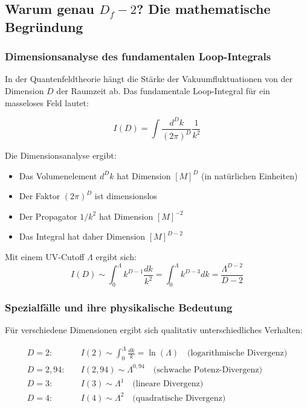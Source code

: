\documentclass[12pt,a4paper]{article}
\theoremstyle{definition}
\begin{document}
	\subsection{Warum genau $D_f - 2$? Die mathematische Begründung}
	
	\subsubsection{Dimensionsanalyse des fundamentalen Loop-Integrals}
	
	In der Quantenfeldtheorie hängt die Stärke der Vakuumfluktuationen von der Dimension $D$ der Raumzeit ab. Das fundamentale Loop-Integral für ein masseloses Feld lautet:
	
	\begin{equation}
		I(D) = \int \frac{d^D k}{(2\pi)^D} \frac{1}{k^2}
	\end{equation}
	
	Die Dimensionsanalyse ergibt:
	\begin{itemize}
		\item Das Volumenelement $d^D k$ hat Dimension $[M]^D$ (in natürlichen Einheiten)
		\item Der Faktor $(2\pi)^D$ ist dimensionslos
		\item Der Propagator $1/k^2$ hat Dimension $[M]^{-2}$
		\item Das Integral hat daher Dimension $[M]^{D-2}$
	\end{itemize}
	
	Mit einem UV-Cutoff $\Lambda$ ergibt sich:
	\begin{equation}
		I(D) \sim \int_0^{\Lambda} k^{D-1} \frac{dk}{k^2} = \int_0^{\Lambda} k^{D-3} dk = \frac{\Lambda^{D-2}}{D-2}
	\end{equation}
	
	\subsubsection{Spezialfälle und ihre physikalische Bedeutung}
	
	Für verschiedene Dimensionen ergibt sich qualitativ unterschiedliches Verhalten:
	
	\begin{align}
		D = 2: \quad &I(2) \sim \int_0^{\Lambda} \frac{dk}{k} = \ln(\Lambda) \quad \text{(logarithmische Divergenz)}\\
		D = 2{,}94: \quad &I(2{,}94) \sim \Lambda^{0{,}94} \quad \text{(schwache Potenz-Divergenz)}\\
		D = 3: \quad &I(3) \sim \Lambda^{1} \quad \text{(lineare Divergenz)}\\
		D = 4: \quad &I(4) \sim \Lambda^{2} \quad \text{(quadratische Divergenz)}
	\end{align}
	
\end{document}
